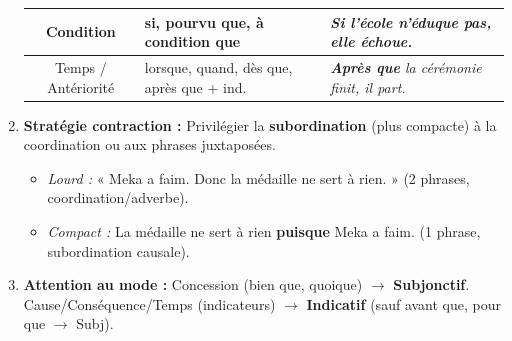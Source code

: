 \documentclass[11pt]{article}
\newcommand{\cle}[1]{{\popxbold\color{popdark}#1}}
\begin{document}
\begin{methode}
\begin{enumerate}
\begin{center}
\begin{tabular}{|c|l|l|}
                Condition & \cle{si, pourvu que, à condition que} & \textit{\textbf{Si} l'école n'éduque pas, elle échoue.} \\ \hline
                Temps / Antériorité & \cle{lorsque, quand, dès que, après que + ind.} & \textit{\textbf{Après que} la cérémonie finit, il part.} \\ \hline
                \end{tabular}
            \end{center}
        \item \textbf{Stratégie contraction :} Privilégier la \textbf{subordination} (plus compacte) à la coordination ou aux phrases juxtaposées.
            \begin{itemize}
                \item \textit{Lourd :} « Meka a faim. Donc la médaille ne sert à rien. » (2 phrases, coordination/adverbe).
                \item \textit{Compact :} \cle{La médaille ne sert à rien \textbf{puisque} Meka a faim.} (1 phrase, subordination causale).
            \end{itemize}
        \item \textbf{Attention au mode :} Concession (\cle{bien que}, \cle{quoique}) $\rightarrow$ \textbf{Subjonctif}. Cause/Conséquence/Temps (indicateurs) $\rightarrow$ \textbf{Indicatif} (sauf \cle{avant que}, \cle{pour que} $\rightarrow$ Subj).
    \end{enumerate}
\end{methode}
\end{document}
